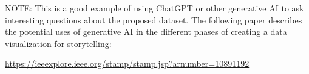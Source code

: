\documentclass[
]{article}
\begin{document}
NOTE: This is a good example of using ChatGPT or other generative AI to
ask interesting questions about the proposed dataset. The following
paper describes the potential uses of generative AI in the different
phases of creating a data visualization for storytelling:

\url{https://ieeexplore.ieee.org/stamp/stamp.jsp?arnumber=10891192}
\end{document}
